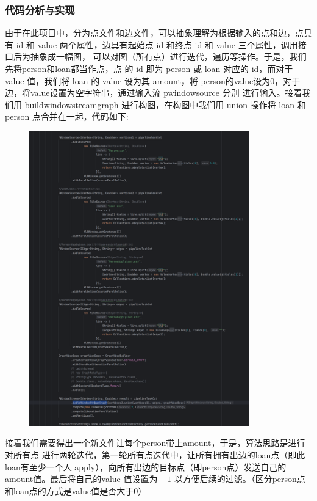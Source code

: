 \subsubsection{代码分析与实现}
由于在此项目中，分为点文件和边文件，可以抽象理解为根据输入的点和边，点具有 id 和
value 两个属性，边具有起始点 id 和终点 id 和 value 三个属性，调用接口后为抽象成一幅图，
可以对图（所有点）进行迭代，遍历等操作。于是，我们先将person和loan都当作点，点
的 id 即为 person 或 loan 对应的 id，而对于 value 值，我们将 loan 的 value 设为其 amount，将
person的value设为0，对于边，将value设置为空字符串，通过输入流 pwindowsource 分别
进行输入。接着我们用 buildwindowstreamgraph 进行构图，在构图中我们用 union 操作将
loan 和 person 点合并在一起，代码如下:
\begin{figure}[H]
  \begin{center}
    \includegraphics[width=0.85\textwidth,scale=0.7]{./figures/pro3/1.png}
  \end{center}
\end{figure}

接着我们需要得出一个新文件让每个person带上amount，于是，算法思路是进行对所有点
进行两轮迭代，第一轮所有点迭代中，让所有拥有出边的loan点（即此loan有至少一个人
apply），向所有出边的目标点（即person点）发送自己的amount值。最后将自己的value
值设置为 $ -1 $
以方便后续的过滤。（区分person点和loan点的方式是value值是否大于0）

